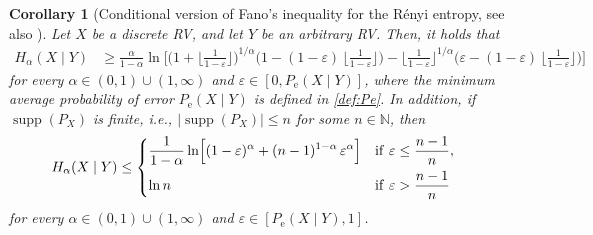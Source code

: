 \documentclass[conference, draftcls, onecolumn]{IEEEtran}
\theoremstyle{plain}
\newtheorem{corollary}{Corollary}
\newcommand{\supp}{\operatorname{supp}}
\begin{document}
\begin{corollary}[{Conditional version of Fano's inequality for the R\'{e}nyi entropy, see also \cite[Theorems~3 and~11]{sason}}]
\label{cor:fano_renyi}
Let $X$ be a discrete RV, and let $Y$ be an arbitrary RV.
Then, it holds that
\begin{align}
H_{\alpha}(X \mid Y)
& \ge
\frac{ \alpha }{ 1 - \alpha } \ln \! \Bigg[ \Big( 1 + \Big\lfloor \frac{ 1 }{ 1 - \varepsilon } \Big\rfloor \Big)^{1/\alpha} \bigg( 1 - ( 1 - \varepsilon ) \, \Big\lfloor \frac{ 1 }{ 1 - \varepsilon } \Big\rfloor \bigg) - \Big\lfloor \frac{ 1 }{ 1 - \varepsilon } \Big\rfloor^{1/\alpha} \bigg( \varepsilon - ( 1 - \varepsilon ) \, \Big\lfloor \frac{ 1 }{ 1 - \varepsilon } \Big\rfloor \bigg) \Bigg]
\label{ineq:reverse_fano_renyi}
\end{align}
for every $\alpha \in (0, 1) \cup (1, \infty)$ and $\varepsilon \in [0, P_{\mathrm{e}}(X \mid Y)]$, where the minimum average probability of error $P_{\mathrm{e}}(X \mid Y)$ is defined in \eqref{def:Pe}.
In addition, if $\supp( P_{X} )$ is finite, i.e., $| \! \supp( P_{X} )| \le n$ for some $n \in \mathbb{N}$, then
\begin{align}
H_{\alpha}(X \mid Y)
& \le
\begin{dcases}
\frac{ 1 }{ 1 - \alpha } \ln \! \Big[ (1 - \varepsilon)^{\alpha} + (n-1)^{1-\alpha} \, \varepsilon^{\alpha} \Big]
& \mathrm{if} \ \varepsilon \le \frac{ n - 1 }{ n } ,
\\
\ln n
& \mathrm{if} \ \varepsilon > \frac{ n - 1 }{ n }
\end{dcases}
\label{ineq:fano_renyi}
\end{align}
for every $\alpha \in (0, 1) \cup (1, \infty)$ and $\varepsilon \in [P_{\mathrm{e}}(X \mid Y), 1]$.
\end{corollary}
\end{document}
